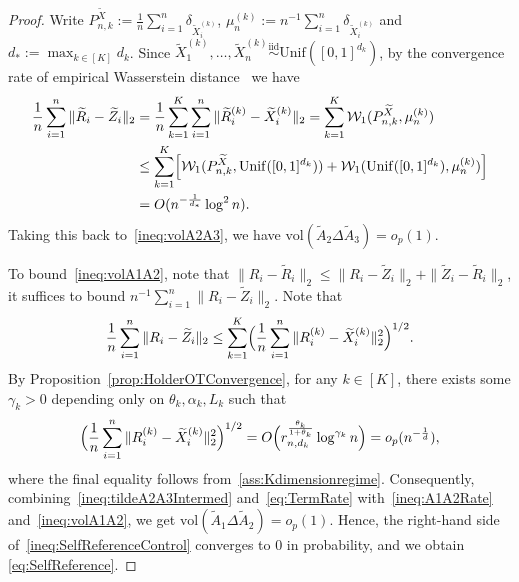 \documentclass[11pt]{article}
\begin{document}
\begin{proof}
Write ${P}_{n, k}^{\widetilde{X}} := \frac{1}{n}\sum_{i = 1}^n \delta_{\widetilde{X}_i^{(k)}}$, $\mu_n^{(k)} := n^{-1}\sum_{i = 1}^n \delta_{\tilde{X}_i^{(k)}}$ and $d_* := \max_{k \in [K]} d_k$. Since $\widetilde{X}_1^{(k)}, \ldots,\widetilde{X}_n^{(k)} \stackrel{\mathrm{iid}}{\sim} \mathrm{Unif}([0, 1]^{d_k})$, by the convergence rate of empirical Wasserstein  distance~\citep{fournier2015rate} we have
\begin{align}
    \frac{1}{n}\sum_{i = 1}^n  \|\widetilde{R}_i - \widetilde{Z}_i\|_2
    &= \frac{1}{n}\sum_{k = 1}^K\sum_{i = 1}^n
    \|\widetilde{R}_i^{(k)} - \widetilde{X}_i^{(k)}\|_2 = \sum_{k = 1}^K\mathcal{W}_1(P_{n, k}^{\widetilde{X}}, \mu_n^{(k)})\notag\\
    &\leq \sum_{k = 1}^K
    \Bigl[\mathcal{W}_1(P_{n, k}^{\widetilde{X}},  \mathrm{Unif}([0, 1]^{d_k}))
    + \mathcal{W}_1( \mathrm{Unif}([0, 1]^{d_k}), \mu_n^{(k)})\Bigr] \notag \\
    &= O(n^{-\frac{1}{d_*}}\log^2 n).
    \label{ineq:A1A2Rate}
\end{align}
Taking this back to~\eqref{ineq:volA2A3}, we have $\mathrm{vol}(\widetilde{A}_2\Delta \widetilde{A}_3) = o_p(1)$. 

To bound~\eqref{ineq:volA1A2}, note that $\|R_i - \widetilde{R}_i\|_2 \leq \|R_i - \widetilde{Z}_i\|_2 + \|\widetilde{Z}_i - \widetilde{R}_i\|_2$, it suffices to bound $n^{-1}\sum_{i = 1}^n \|R_i - \widetilde{Z}_i\|_2$. Note that 
\begin{align}
    \frac{1}{n}\sum_{i = 1}^n \|R_i - \widetilde{Z}_i\|_2 \leq  \sum_{k = 1}^K\Bigl(\frac{1}{n}\sum_{i = 1}^n\|R_i^{(k)} - \widetilde{X}_i^{(k)}\|_2^2\Bigr)^{1/2}. \label{ineq:tildeA2A3Intermed}
\end{align}
By Proposition~\ref{prop:HolderOTConvergence}, for any $k \in [K]$, there exists some $\gamma_k>0$ depending only on $\theta_k, \alpha_k, L_k$ such that  
\begin{align}
\Bigl(\frac{1}{n}\sum_{i = 1}^n\|R_i^{(k)} - \widetilde{X}_i^{(k)}\|_2^2\Bigr)^{1/2} = O\Bigl(r_{n, d_k}^{\frac{\theta_k}{1+\theta_k}} \log^{\gamma_k}n\Bigr) = o_p(n^{-\frac{1}{d}}), \label{eq:TermRate}
\end{align}
where the final equality follows from~\ref{ass:Kdimensionregime}. Consequently, combining~\eqref{ineq:tildeA2A3Intermed} and~\eqref{eq:TermRate} with~\eqref{ineq:A1A2Rate} and~\eqref{ineq:volA1A2}, we get $\mathrm{vol}(\widetilde{A}_1 \Delta \widetilde{A}_2) =o_p(1)$. Hence, the right-hand side of~\eqref{ineq:SelfReferenceControl} converges to 0 in probability, and we obtain \eqref{eq:SelfReference}. 


\end{proof}
\end{document}
